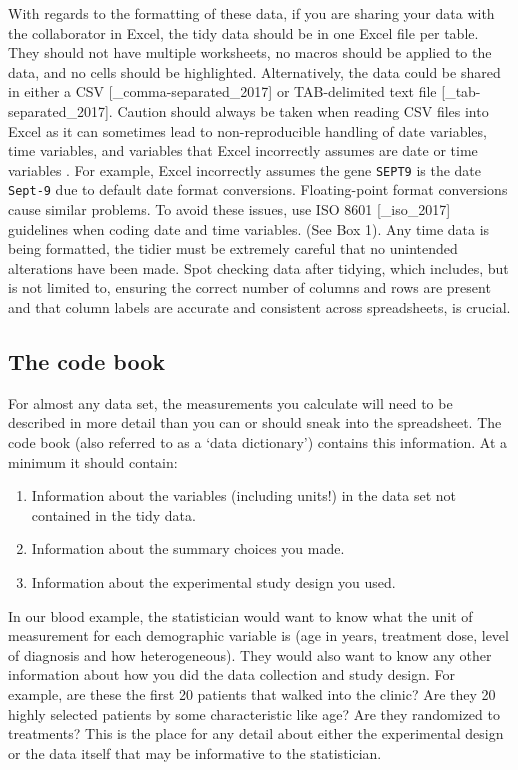 \documentclass[12pt]{article}
\providecommand{\tightlist}{%
  \setlength{\itemsep}{0pt}\setlength{\parskip}{0pt}}
\begin{document}
With regards to the formatting of these data, if you are sharing your
data with the collaborator in Excel, the tidy data should be in one
Excel file per table. They should not have multiple worksheets, no
macros should be applied to the data, and no cells should be
highlighted. Alternatively, the data could be shared in either a CSV
{[}\_comma-separated\_2017{]} or TAB-delimited text file
{[}\_tab-separated\_2017{]}. Caution should always be taken when reading
CSV files into Excel as it can sometimes lead to non-reproducible
handling of date variables, time variables, and variables that Excel
incorrectly assumes are date or time variables
\citep{zeeberg_mistaken_2004}. For example, Excel incorrectly assumes
the gene \texttt{SEPT9} is the date \texttt{Sept-9} due to default date
format conversions. Floating-point format conversions cause similar
problems. To avoid these issues, use ISO 8601 {[}\_iso\_2017{]}
guidelines when coding date and time variables. (See Box 1). Any time
data is being formatted, the tidier must be extremely careful that no
unintended alterations have been made. Spot checking data after tidying,
which includes, but is not limited to, ensuring the correct number of
columns and rows are present and that column labels are accurate and
consistent across spreadsheets, is crucial.

\subsection{The code book}
\label{sec:codebook}

For almost any data set, the measurements you calculate will need to be
described in more detail than you can or should sneak into the
spreadsheet. The code book (also referred to as a `data dictionary')
contains this information. At a minimum it should contain:

\begin{enumerate}
\def\labelenumi{\arabic{enumi}.}
\tightlist
\item
  Information about the variables (including units!) in the data set not
  contained in the tidy data.
\item
  Information about the summary choices you made.
\item
  Information about the experimental study design you used.
\end{enumerate}

In our blood example, the statistician would want to know what the unit
of measurement for each demographic variable is (age in years, treatment
dose, level of diagnosis and how heterogeneous). They would also want to
know any other information about how you did the data collection and
study design. For example, are these the first 20 patients that walked
into the clinic? Are they 20 highly selected patients by some
characteristic like age? Are they randomized to treatments? This is the
place for any detail about either the experimental design or the data
itself that may be informative to the statistician.
\end{document}
